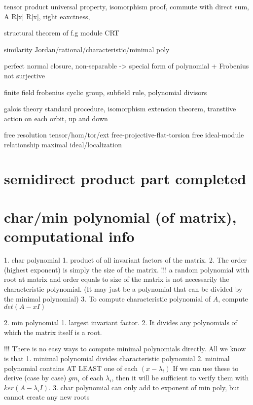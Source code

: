 tensor product
    universal property, isomorphism proof, commute with direct sum, A \times R[x] \cong R[x], right eaxctness,
    
structural theorem of f.g module
    CRT

similarity
    Jordan/rational/characteristic/minimal poly
    
    
perfect
    normal closure, non-separable -> special form of polynomial + Frobenius not surjective
    
finite field
    frobenius cyclic group, subfield rule, polynomial divisors
    
galois theory
    standard procedure, isomorphism extension theorem, transtiive action on each orbit, up and down
    
    
free resolution
    tensor/hom/tor/ext
free-projective-flat-torsion free
    ideal-module relationship
maximal ideal/localization

\section*{semidirect product part completed}


\section*{char/min polynomial (of matrix), computational info}
1. char polynomial
	1. product of all invariant factors of the matrix. 
    2. The order (highest exponent) is simply the size of the matrix. 
 	!!! a random polynomial with root at matrix and order equals to size of the matrix is not necessarily the characteristic polynomial. (It may just be a polynomial that can be divided by the minimal polynomial)
    3. To compute characteristic polynomial of $A$, compute $det(A-xI)$
 
2. min polynomial
	1. largest invariant factor. 
    2. It divides any polynomials of which the matrix itself is a root. 
    


!!! There is no easy ways to compute minimal polynomials directly. All we know is that
	1. minimal polynomial divides characteristic polynomial
	2. minimal polynomial contains AT LEAST one of each $(x-\lambda_i)$
If we can use these to derive (case by case) $gm_i$ of each $\lambda_i$, then it will be sufficient to verify them with $ker(A-\lambda_iI)$.
    3. char polynomial can only add to exponent of min poly, but cannot create any new roots
    

